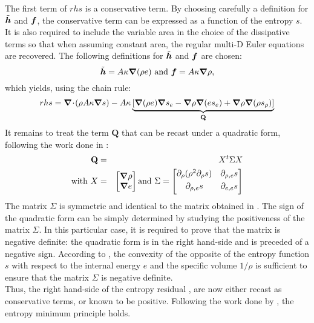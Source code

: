 %
The first term of $rhs$ is a conservative term. By choosing carefully a definition for $\tilde{\boldsymbol h}$ and $\boldsymbol f$, the conservative term can be expressed as a function of the entropy $s$. It is also required to include the variable area in the choice of the dissipative terms so that when assuming constant area, the regular multi-D Euler equations are recovered. The following definitions for $\tilde{\boldsymbol h}$ and $\boldsymbol f$ are chosen:
%
\begin{equation}
\tilde{\boldsymbol h} = A \kappa \boldsymbol{\nabla} ( \rho e ) \text{ and } \boldsymbol f = A \kappa \boldsymbol{\nabla} \rho, \nonumber 
\end{equation}
%
which yields, using the chain rule:
%
\begin{equation}
rhs = \boldsymbol{\nabla}\! \cdot \! (\rho A \kappa \boldsymbol{\nabla} s ) - A \kappa \underbrace{\left[ \boldsymbol{\nabla} (\rho e) \boldsymbol{\nabla} s_e  - \boldsymbol{\nabla} \rho \boldsymbol{\nabla} (e s_e) +  \boldsymbol{\nabla} \rho \boldsymbol{\nabla} ( \rho s_{\rho} )  \right]}_{\mathbf{Q}} \nonumber
\end{equation}
%
It remains to treat the term $\mathbf{Q}$ that can be recast under a quadratic form, following the work done in \cite{jlg}:
%
\begin{eqnarray}
\mathbf{Q} &=& X^t \Sigma X \nonumber \\
\text{with } X &=& \begin{bmatrix}
\boldsymbol{\nabla} \rho \\
\boldsymbol{\nabla} e 
\end{bmatrix}
\text{and } \Sigma = \begin{bmatrix}
       \partial_{\rho} (\rho^2 \partial_{\rho} s) & \partial_{\rho,e} s  \\[0.3em]
       \partial_{\rho,e} s & \partial_{e,e} s           \\[0.3em]
     \end{bmatrix} \nonumber 
\end{eqnarray}
%
The matrix $\Sigma$ is symmetric and identical to the matrix obtained in \cite{jlg}. The sign of the quadratic form can be simply determined by studying the positiveness of the matrix $\Sigma$. In this particular case, it is required to prove that the matrix is negative definite: the quadratic form is in the right hand-side and is preceded of a negative sign. According to \cite{jlg}, the convexity of the opposite of the entropy function $s$ with respect to the internal energy $e$ and the specific volume $1/ \rho$ is sufficient to ensure that the matrix $\Sigma$ is negative definite. \\
Thus, the right hand-side of the entropy residual , are now either recast as conservative terms, or known to be positive. Following the work done by \cite{jlg}, the entropy minimum principle holds.

\pagebreak{}